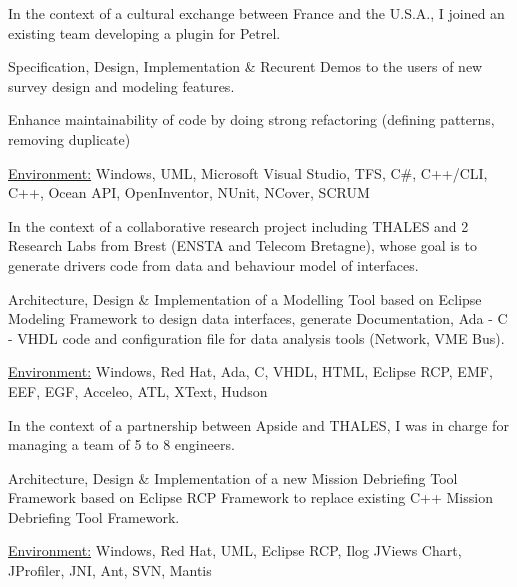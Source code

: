 \documentclass[10pt,letterpaper]{resume/resume}
\begin{document}
\begin{minipage}[t]{\linewidth}
\par In the context of a cultural exchange between France and the U.S.A., I joined an existing team developing a plugin for Petrel.
\par Specification, Design, Implementation \& Recurent Demos to the users of new survey design and modeling features.
\par Enhance maintainability of code by doing strong refactoring (defining patterns, removing duplicate)
\par\underline{Environment:} Windows, UML, Microsoft Visual Studio, TFS, C\#, C++/CLI, C++, Ocean API, OpenInventor, NUnit, NCover, SCRUM


\par In the context of a collaborative research project including THALES and 2 Research Labs from Brest (ENSTA and Telecom Bretagne), whose goal is to generate drivers code from data and behaviour model of interfaces.
\par Architecture, Design \& Implementation of a Modelling Tool based on Eclipse Modeling Framework to design data interfaces, generate Documentation, Ada - C - VHDL code and configuration file for data analysis tools (Network, VME Bus).
\par\underline{Environment:} Windows, Red Hat, Ada, C, VHDL, HTML, Eclipse RCP, EMF, EEF, EGF, Acceleo, ATL, XText, Hudson

\par In the context of a partnership between Apside and THALES, I was in charge for managing a team of 5 to 8 engineers.
\par Architecture, Design \& Implementation of a new Mission Debriefing Tool Framework based on Eclipse RCP Framework to replace existing C++ Mission Debriefing Tool Framework.
\par\underline{Environment:} Windows, Red Hat, UML, Eclipse RCP, Ilog JViews Chart, JProfiler, JNI, Ant, SVN, Mantis
%


\end{minipage}
\end{document}
